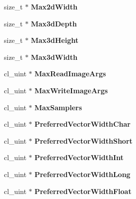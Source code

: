 \begin{DoxyCompactItemize}
\hypertarget{structdevices_a18f56dc01b4463c4ded05b3d35c829d8}{}\label{structdevices_a18f56dc01b4463c4ded05b3d35c829d8} 
size\+\_\+t $\ast$ {\bfseries Max2d\+Width}
\item 
\hypertarget{structdevices_acaf6beb0a2264711c7819587a4459ac2}{}\label{structdevices_acaf6beb0a2264711c7819587a4459ac2} 
size\+\_\+t $\ast$ {\bfseries Max3d\+Depth}
\item 
\hypertarget{structdevices_a556a1e11d72df9890409b935d0582f89}{}\label{structdevices_a556a1e11d72df9890409b935d0582f89} 
size\+\_\+t $\ast$ {\bfseries Max3d\+Height}
\item 
\hypertarget{structdevices_ab44a9760cf2dc77618720a2a5828e8e9}{}\label{structdevices_ab44a9760cf2dc77618720a2a5828e8e9} 
size\+\_\+t $\ast$ {\bfseries Max3d\+Width}
\item 
\hypertarget{structdevices_af060538b760d37d69f1e5995af4928d9}{}\label{structdevices_af060538b760d37d69f1e5995af4928d9} 
cl\+\_\+uint $\ast$ {\bfseries Max\+Read\+Image\+Args}
\item 
\hypertarget{structdevices_accf0de8457f8fdb7b72b6e2103c79cd4}{}\label{structdevices_accf0de8457f8fdb7b72b6e2103c79cd4} 
cl\+\_\+uint $\ast$ {\bfseries Max\+Write\+Image\+Args}
\item 
\hypertarget{structdevices_a9a25cdc63c37597479a8863ffc94440c}{}\label{structdevices_a9a25cdc63c37597479a8863ffc94440c} 
cl\+\_\+uint $\ast$ {\bfseries Max\+Samplers}
\item 
\hypertarget{structdevices_a0cf0b0ac0fe1535afc27d9fe2149d354}{}\label{structdevices_a0cf0b0ac0fe1535afc27d9fe2149d354} 
cl\+\_\+uint $\ast$ {\bfseries Preferred\+Vector\+Width\+Char}
\item 
\hypertarget{structdevices_a8487ae555d79b9b78bbfd7b76e2f90d1}{}\label{structdevices_a8487ae555d79b9b78bbfd7b76e2f90d1} 
cl\+\_\+uint $\ast$ {\bfseries Preferred\+Vector\+Width\+Short}
\item 
\hypertarget{structdevices_a81160e33a03587e3694ae6ff69471643}{}\label{structdevices_a81160e33a03587e3694ae6ff69471643} 
cl\+\_\+uint $\ast$ {\bfseries Preferred\+Vector\+Width\+Int}
\item 
\hypertarget{structdevices_a4dc38a84c0b638f142cb5ba2b886b032}{}\label{structdevices_a4dc38a84c0b638f142cb5ba2b886b032} 
cl\+\_\+uint $\ast$ {\bfseries Preferred\+Vector\+Width\+Long}
\item 
\hypertarget{structdevices_a1b05f9cf6d0b49016bf48833ea3ff0e3}{}\label{structdevices_a1b05f9cf6d0b49016bf48833ea3ff0e3} 
cl\+\_\+uint $\ast$ {\bfseries Preferred\+Vector\+Width\+Float}

\end{DoxyCompactItemize}

